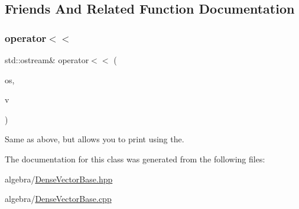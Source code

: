 \subsection{Friends And Related Function Documentation}
\mbox{\label{classfemus_1_1_dense_vector_base_aeb01fcf21134efd347c12ee61de79ba6}} 
\subsubsection{\texorpdfstring{operator$<$$<$}{operator<<}}
{\footnotesize\ttfamily std\+::ostream\& operator$<$$<$ (\begin{DoxyParamCaption}\item[{std\+::ostream \&}]{os,  }\item[{const \mbox{\hyperlink{classfemus_1_1_dense_vector_base}{Dense\+Vector\+Base}} \&}]{v }\end{DoxyParamCaption})\hspace{0.3cm}{\ttfamily [friend]}}



Same as above, but allows you to print using the. 



The documentation for this class was generated from the following files\+:\begin{DoxyCompactItemize}
\item 
algebra/\mbox{\hyperlink{_dense_vector_base_8hpp}{Dense\+Vector\+Base.\+hpp}}\item 
algebra/\mbox{\hyperlink{_dense_vector_base_8cpp}{Dense\+Vector\+Base.\+cpp}}\end{DoxyCompactItemize}
